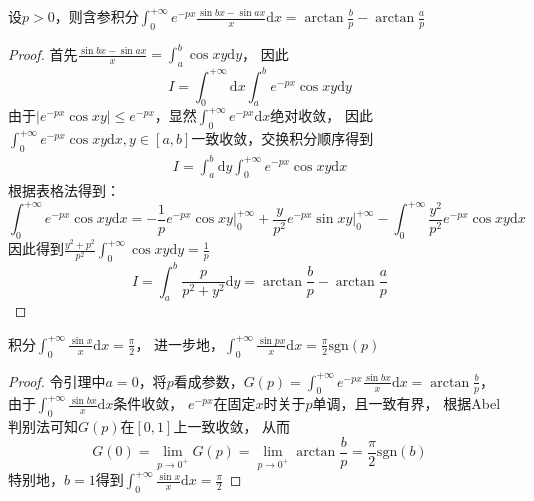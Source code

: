 \begin{lemma}
  设$p > 0$，则含参积分$\int_0^{+\infty} e^{-px} \frac{\sin bx - \sin ax}{x} \mathrm{d} x = \arctan \frac{b}{p} - \arctan \frac{a}{p}$
\end{lemma}

\begin{proof}
  首先$\frac{\sin bx - \sin ax}{x} = \int_a^b \cos xy \mathrm{d} y$，
  因此
  \begin{equation*}
    I = \int_0^{+\infty} \mathrm{d} x \int _a^b e^{-px}\cos xy \mathrm{d} y
  \end{equation*}
  由于$|e^{-px}\cos xy| \leq e^{-px}$，显然$\int_0^{+\infty} e^{-px}\mathrm{d} x$绝对收敛，
  因此$\int_0^{+\infty}e^{-px}\cos xy\mathrm{d}x, y \in [a,b]$一致收敛，交换积分顺序得到
  \begin{align*}
    I = \int_a^b \mathrm{d} y \int_0^{+\infty} e^{-px} \cos xy \mathrm{d} x
  \end{align*}
  根据表格法得到：
  \begin{equation*}
    \int_0^{+\infty} e^{-px}\cos xy \mathrm{d} x = - \frac{1}{p} e^{-px}\cos xy   \bigg|^{+\infty}_0 + \frac{y}{p^2} e^{-px} \sin xy   \bigg|_0^{+\infty} - \int_0^{+\infty} \frac{y^2}{p^2} e^{-px} \cos xy\mathrm{d} x 
  \end{equation*}
  因此得到$\frac{y^2 + p^2}{p^2} \int _0^{+\infty} \cos xy\mathrm{d} y = \frac{1}{p}$
  \begin{equation*}
    I = \int_a^b \frac{p}{p^2 + y^2}\mathrm{d} y = \arctan \frac{b}{p} - \arctan \frac{a}{p}
  \end{equation*}
\end{proof}

\begin{theorem}[Dirichlet积分]
  积分$\int _0^{+\infty} \frac{\sin x}{x} \mathrm{d} x = \frac{\pi}{2}$，
  进一步地，$\int_0^{+\infty} \frac{\sin px}{x}\mathrm{d} x = \frac{\pi}{2} \text{sgn}(p)$
\end{theorem}

\begin{proof}
  令引理中$a = 0$，将$p$看成参数，$G(p)= \int_0^{+\infty} e^{-px} \frac{\sin bx}{x} \mathrm{d} x = \arctan \frac{b}{p}$，
  由于$\int_0^{+\infty} \frac{\sin bx}{x}\mathrm{d} x$条件收敛，
  $e^{-px}$在固定$x$时关于$p$单调，且一致有界，
  根据Abel判别法可知$G(p)$在$[0,1]$上一致收敛，
  从而
  \begin{equation*}
    G(0) = \lim \limits _{p \rightarrow 0^+} G(p) = \lim \limits _{p \rightarrow 0^+} \arctan \frac{b}{p} = \frac{\pi}{2}\text{sgn}(b)
  \end{equation*}
  特别地，$b = 1$得到$\int_0^{+\infty} \frac{\sin x}{x}\mathrm{d} x = \frac{\pi}{2}$
\end{proof}

